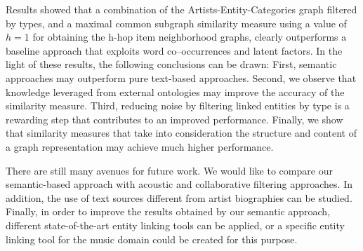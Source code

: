 Results showed that a combination of the Artists-Entity-Categories graph filtered by types, and a maximal common subgraph similarity measure using a value of $h=1$ for obtaining the h-hop item neighborhood graphs, clearly outperforms a baseline approach that exploits word co--occurrences and latent factors. In the light of these results, the following conclusions can be drawn: First, semantic approaches may outperform pure text-based approaches. Second, we observe that knowledge leveraged from external ontologies may improve the accuracy of the similarity measure. Third, reducing noise by filtering linked entities by type is a rewarding step that contributes to an improved performance. Finally, we show that similarity measures that take into consideration the structure and content of a graph representation may achieve much higher performance.

There are still many avenues for future work. We would like to compare our semantic-based approach with acoustic and collaborative filtering approaches. In addition, the use of text sources different from artist biographies can be studied. Finally, in order to improve the results obtained by our semantic approach, different state-of-the-art entity linking tools can be applied, or a specific entity linking tool for the music domain could be created for this purpose.